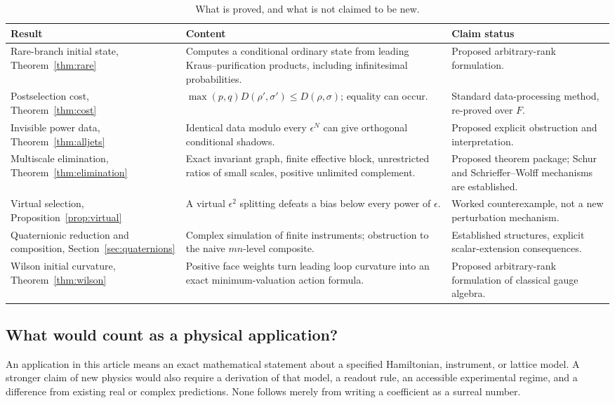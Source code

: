 \documentclass[11pt,oneside]{article}
\numberwithin{equation}{section}
\theoremstyle{plain}
\theoremstyle{definition}
\theoremstyle{remark}
\begin{document}
\begin{table}[ht]
\centering\small
\begin{tabularx}{\textwidth}{@{}L{0.26\textwidth}YL{0.23\textwidth}@{}}
\toprule
Result & Content & Claim status\\
\midrule
Rare-branch initial state, Theorem~\ref{thm:rare}
& Computes a conditional ordinary state from leading Kraus--purification products, including infinitesimal probabilities.
& Proposed arbitrary-rank formulation.\\[3pt]
Postselection cost, Theorem~\ref{thm:cost}
& $\max(p,q)D(\rho',\sigma')\le D(\rho,\sigma)$; equality can occur.
& Standard data-processing method, re-proved over $F$.\\[3pt]
Invisible power data, Theorem~\ref{thm:alljets}
& Identical data modulo every $\epsilon^N$ can give orthogonal conditional shadows.
& Proposed explicit obstruction and interpretation.\\[3pt]
Multiscale elimination, Theorem~\ref{thm:elimination}
& Exact invariant graph, finite effective block, unrestricted ratios of small scales, positive unlimited complement.
& Proposed theorem package; Schur and Schrieffer--Wolff mechanisms are established.\\[3pt]
Virtual selection, Proposition~\ref{prop:virtual}
& A virtual $\epsilon^2$ splitting defeats a bias below every power of $\epsilon$.
& Worked counterexample, not a new perturbation mechanism.\\[3pt]
Quaternionic reduction and composition, Section~\ref{sec:quaternions}
& Complex simulation of finite instruments; obstruction to the naive $mn$-level composite.
& Established structures, explicit scalar-extension consequences.\\[3pt]
Wilson initial curvature, Theorem~\ref{thm:wilson}
& Positive face weights turn leading loop curvature into an exact minimum-valuation action formula.
& Proposed arbitrary-rank formulation of classical gauge algebra.\\
\bottomrule
\end{tabularx}
\caption{What is proved, and what is not claimed to be new.}\label{tab:contributions}
\end{table}

\subsection{What would count as a physical application?}
An application in this article means an exact mathematical statement about a specified Hamiltonian, instrument, or lattice model. A stronger claim of new physics would also require a derivation of that model, a readout rule, an accessible experimental regime, and a difference from existing real or complex predictions. None follows merely from writing a coefficient as a surreal number.
\end{document}

